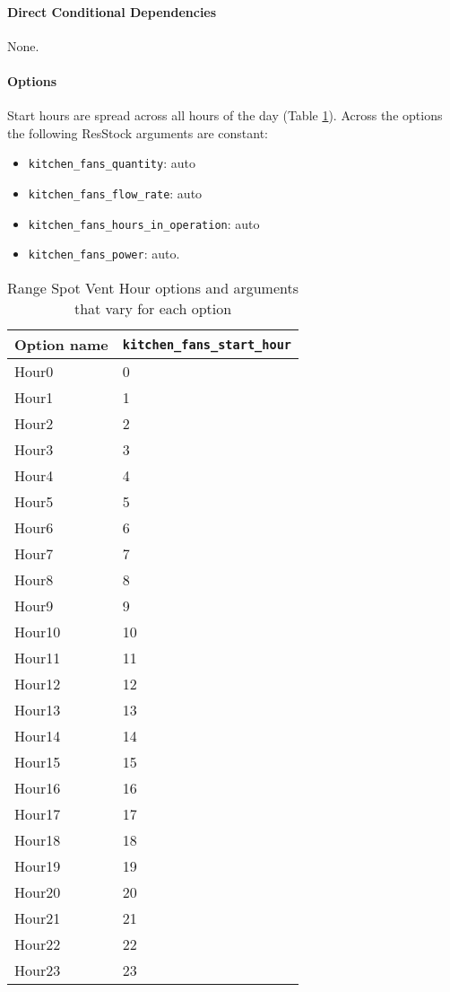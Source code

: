 \paragraph{Direct Conditional Dependencies}
None.
\paragraph{Options}
Start hours are spread across all hours of the day (Table \ref{table:hc_opt_range_vent}). Across the options the following ResStock arguments are constant: 
\begin{itemize}
    \item \texttt{kitchen\_fans\_quantity}: auto
    \item \texttt{kitchen\_fans\_flow\_rate}: auto
    \item \texttt{kitchen\_fans\_hours\_in\_operation}: auto
    \item \texttt{kitchen\_fans\_power}: auto.
\end{itemize}

\begin{longtable}[]{|p{3.5cm}|p{6cm}|}\caption{Range Spot Vent Hour options and arguments that vary for each option} \label{table:hc_opt_range_vent} \\
\toprule\noalign{}
Option name &  \texttt{kitchen\_fans\_start\_hour} \\
\midrule\noalign{}
\endhead
\bottomrule\noalign{}
\endlastfoot
Hour0 & 0 \\
Hour1 &  1 \\
Hour2 & 2 \\
Hour3 &  3 \\
Hour4 &  4 \\
Hour5 & 5 \\
Hour6 &  6 \\
Hour7 & 7 \\
Hour8 & 8 \\
Hour9 &  9 \\
Hour10 & 10 \\
Hour11 & 11 \\
Hour12 & 12 \\
Hour13 &  13 \\
Hour14 & 14 \\
Hour15 & 15 \\
Hour16 & 16 \\
Hour17 &  17 \\
Hour18 & 18 \\
Hour19 & 19 \\
Hour20 & 20 \\
Hour21 & 21 \\
Hour22 & 22 \\
Hour23 &  23 \\
\end{longtable}

